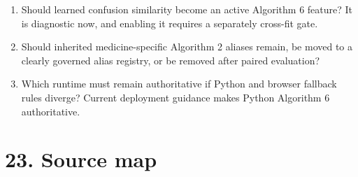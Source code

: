 \begin{enumerate}
\item
  Should learned confusion similarity become an active Algorithm 6 feature? It is diagnostic now, and enabling it requires a separately cross-fit gate.
\item
  Should inherited medicine-specific Algorithm 2 aliases remain, be moved to a clearly governed alias registry, or be removed after paired evaluation?
\item
  Which runtime must remain authoritative if Python and browser fallback rules diverge? Current deployment guidance makes Python Algorithm 6 authoritative.
\end{enumerate}

\section{23. Source map}\label{23-source-map}

